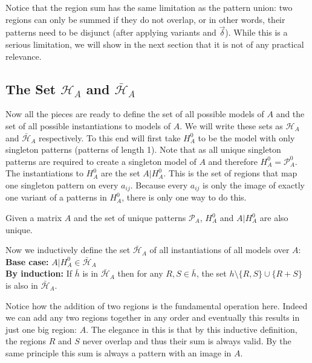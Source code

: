 \documentclass{llncs}
\begin{document}
Notice that the region sum has the same limitation as the pattern union: two regions can only be summed if they do not overlap, or in other words, their patterns need to be disjunct (after applying variants and $\vec{\delta}$). While this is a serious limitation, we will show in the next section that it is not of any practical relevance.

\subsection{The Set $\mathcal{H}_A$ and $\bar{\mathcal{H}}_A$}\label{thesetH}

Now all the pieces are ready to define the set of all possible models of $A$ and the set of all possible instantiations to models of $A$. We will write these sets as $\mathcal{H}_A$ and $\bar{\mathcal{H}}_A$ respectively. To this end will first take $H_A^0$ to be the model with only singleton patterns (patterns of length 1). Note that as all unique singleton patterns are required to create a singleton model of $A$ and therefore $H_A^0=\mathcal{P}_A^0$. The instantiations to $H_A^0$ are the set $A|H_A^0$. This is the set of regions that map one singleton pattern on every $a_{ij}$. Because every $a_{ij}$ is only the image of exactly one variant of a patterns in $H_A^0$, there is only one way to do this.
\begin{theorem}
Given a matrix $A$ and the set of unique patterns $\mathcal{P}_A$, $H_A^0$ and $A|H_A^0$ are also unique.
\end{theorem}
Now we inductively define the set $\bar{\mathcal{H}}_A$ of all instantiations of all models over $A$:\\
\textbf{Base case:} $A|H_A^0 \in \bar{\mathcal{H}}_A$\\
\textbf{By induction:} If $\bar{h}$ is in $\bar{\mathcal{H}}_A$ then for any $R,S \in \bar{h}$, the set $h\setminus\{R,S\}\cup \{R + S\}$ is also in $\bar{\mathcal{H}}_A$.

Notice how the addition of two regions is the fundamental operation here. Indeed we can add any two regions together in any order and eventually this results in just one big region: $A$. The elegance in this is that by this inductive definition, the regions $R$ and $S$ never overlap and thus their sum is always valid. By the same principle this sum is always a pattern with an image in $A$.
\end{document}
